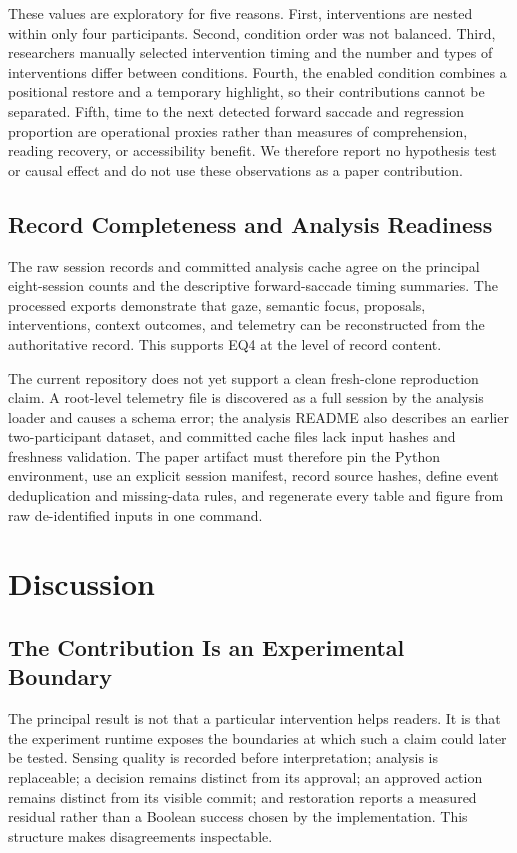 \documentclass[sigconf,review,anonymous]{acmart}
\begin{document}
These values are exploratory for five reasons.
First, interventions are nested within only four participants.
Second, condition order was not balanced.
Third, researchers manually selected intervention timing and the number and types of interventions differ between conditions.
Fourth, the enabled condition combines a positional restore and a temporary highlight, so their contributions cannot be separated.
Fifth, time to the next detected forward saccade and regression proportion are operational proxies rather than measures of comprehension, reading recovery, or accessibility benefit.
We therefore report no hypothesis test or causal effect and do not use these observations as a paper contribution.

\subsection{Record Completeness and Analysis Readiness}

The raw session records and committed analysis cache agree on the principal eight-session counts and the descriptive forward-saccade timing summaries.
The processed exports demonstrate that gaze, semantic focus, proposals, interventions, context outcomes, and telemetry can be reconstructed from the authoritative record.
This supports EQ4 at the level of record content.

The current repository does not yet support a clean fresh-clone reproduction claim.
A root-level telemetry file is discovered as a full session by the analysis loader and causes a schema error; the analysis README also describes an earlier two-participant dataset, and committed cache files lack input hashes and freshness validation.
The paper artifact must therefore pin the Python environment, use an explicit session manifest, record source hashes, define event deduplication and missing-data rules, and regenerate every table and figure from raw de-identified inputs in one command.

\section{Discussion}

\subsection{The Contribution Is an Experimental Boundary}

The principal result is not that a particular intervention helps readers.
It is that the experiment runtime exposes the boundaries at which such a claim could later be tested.
Sensing quality is recorded before interpretation; analysis is replaceable; a decision remains distinct from its approval; an approved action remains distinct from its visible commit; and restoration reports a measured residual rather than a Boolean success chosen by the implementation.
This structure makes disagreements inspectable.
\end{document}
